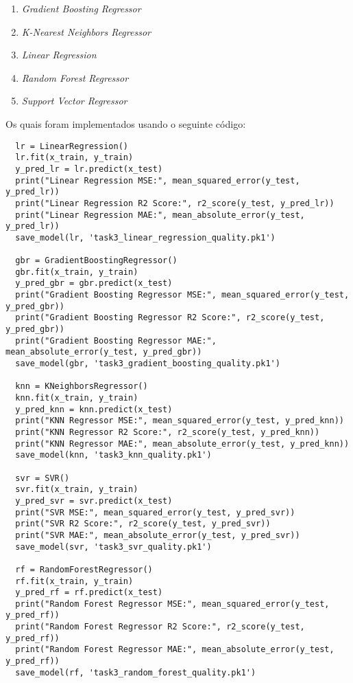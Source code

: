 \documentclass{article}
\begin{document}
\begin{enumerate}
  \item \textit{Gradient Boosting Regressor}
  \item \textit{K-Nearest Neighbors Regressor}
  \item \textit{Linear Regression}
  \item \textit{Random Forest Regressor}
  \item \textit{Support Vector Regressor}
\end{enumerate}

Os quais foram implementados usando o seguinte código:

\begin{verbatim}
  lr = LinearRegression()
  lr.fit(x_train, y_train)
  y_pred_lr = lr.predict(x_test)
  print("Linear Regression MSE:", mean_squared_error(y_test, y_pred_lr))
  print("Linear Regression R2 Score:", r2_score(y_test, y_pred_lr))
  print("Linear Regression MAE:", mean_absolute_error(y_test, y_pred_lr))
  save_model(lr, 'task3_linear_regression_quality.pk1')

  gbr = GradientBoostingRegressor()
  gbr.fit(x_train, y_train)
  y_pred_gbr = gbr.predict(x_test)
  print("Gradient Boosting Regressor MSE:", mean_squared_error(y_test, y_pred_gbr))
  print("Gradient Boosting Regressor R2 Score:", r2_score(y_test, y_pred_gbr))
  print("Gradient Boosting Regressor MAE:", mean_absolute_error(y_test, y_pred_gbr))
  save_model(gbr, 'task3_gradient_boosting_quality.pk1')

  knn = KNeighborsRegressor()
  knn.fit(x_train, y_train)
  y_pred_knn = knn.predict(x_test)
  print("KNN Regressor MSE:", mean_squared_error(y_test, y_pred_knn))
  print("KNN Regressor R2 Score:", r2_score(y_test, y_pred_knn))
  print("KNN Regressor MAE:", mean_absolute_error(y_test, y_pred_knn))
  save_model(knn, 'task3_knn_quality.pk1')

  svr = SVR()
  svr.fit(x_train, y_train)
  y_pred_svr = svr.predict(x_test)
  print("SVR MSE:", mean_squared_error(y_test, y_pred_svr))
  print("SVR R2 Score:", r2_score(y_test, y_pred_svr))
  print("SVR MAE:", mean_absolute_error(y_test, y_pred_svr))
  save_model(svr, 'task3_svr_quality.pk1')

  rf = RandomForestRegressor()
  rf.fit(x_train, y_train)
  y_pred_rf = rf.predict(x_test)
  print("Random Forest Regressor MSE:", mean_squared_error(y_test, y_pred_rf))
  print("Random Forest Regressor R2 Score:", r2_score(y_test, y_pred_rf))
  print("Random Forest Regressor MAE:", mean_absolute_error(y_test, y_pred_rf))
  save_model(rf, 'task3_random_forest_quality.pk1')
\end{verbatim}
\end{document}
